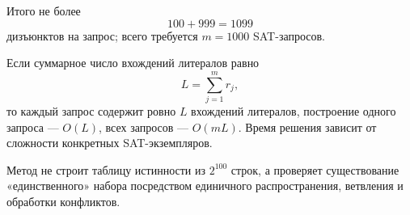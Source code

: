 \documentclass[11pt]{article}
\begin{document}
Итого не более
\[
100+999=1099
\]
дизъюнктов на запрос; всего требуется $m=1000$ SAT-запросов.

Если суммарное число вхождений литералов равно
\[
L=\sum_{j=1}^{m} r_j,
\]
то каждый запрос содержит ровно $L$ вхождений литералов, построение одного запроса — $O(L)$, всех запросов — $O(mL)$. Время решения зависит от сложности конкретных SAT-экземпляров.

Метод не строит таблицу истинности из $2^{100}$ строк, а проверяет существование «единственного» набора посредством единичного распространения, ветвления и обработки конфликтов.
\end{document}
